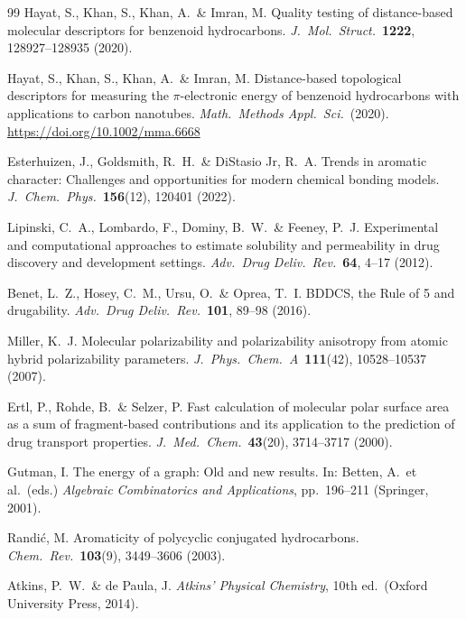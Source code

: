 \documentclass[12pt,a4paper]{article}
\begin{document}
\begin{thebibliography}{99}
Hayat, S., Khan, S., Khan, A.\ \& Imran, M.
Quality testing of distance-based molecular descriptors for benzenoid hydrocarbons.
\textit{J.\ Mol.\ Struct.}\ \textbf{1222}, 128927--128935 (2020).

Hayat, S., Khan, S., Khan, A.\ \& Imran, M.
Distance-based topological descriptors for measuring the $\pi$-electronic energy of benzenoid hydrocarbons with applications to carbon nanotubes.
\textit{Math.\ Methods Appl.\ Sci.}\ (2020). \url{https://doi.org/10.1002/mma.6668}

Esterhuizen, J., Goldsmith, R.~H.\ \& DiStasio Jr, R.~A.
Trends in aromatic character: Challenges and opportunities for modern chemical bonding models.
\textit{J.\ Chem.\ Phys.}\ \textbf{156}(12), 120401 (2022).

Lipinski, C.~A., Lombardo, F., Dominy, B.~W.\ \& Feeney, P.~J.
Experimental and computational approaches to estimate solubility and permeability in drug discovery and development settings.
\textit{Adv.\ Drug Deliv.\ Rev.}\ \textbf{64}, 4--17 (2012).

Benet, L.~Z., Hosey, C.~M., Ursu, O.\ \& Oprea, T.~I.
BDDCS, the Rule of 5 and drugability.
\textit{Adv.\ Drug Deliv.\ Rev.}\ \textbf{101}, 89--98 (2016).

Miller, K.~J.
Molecular polarizability and polarizability anisotropy from atomic hybrid polarizability parameters.
\textit{J.\ Phys.\ Chem.\ A}\ \textbf{111}(42), 10528--10537 (2007).

Ertl, P., Rohde, B.\ \& Selzer, P.
Fast calculation of molecular polar surface area as a sum of fragment-based contributions and its application to the prediction of drug transport properties.
\textit{J.\ Med.\ Chem.}\ \textbf{43}(20), 3714--3717 (2000).

Gutman, I.
The energy of a graph: Old and new results.
In: Betten, A.\ et al.\ (eds.) \textit{Algebraic Combinatorics and Applications}, pp.~196--211 (Springer, 2001).

Randi\'{c}, M.
Aromaticity of polycyclic conjugated hydrocarbons.
\textit{Chem.\ Rev.}\ \textbf{103}(9), 3449--3606 (2003).

Atkins, P.~W.\ \& de Paula, J.
\textit{Atkins' Physical Chemistry}, 10th ed.\ (Oxford University Press, 2014).


\end{thebibliography}
\end{document}
